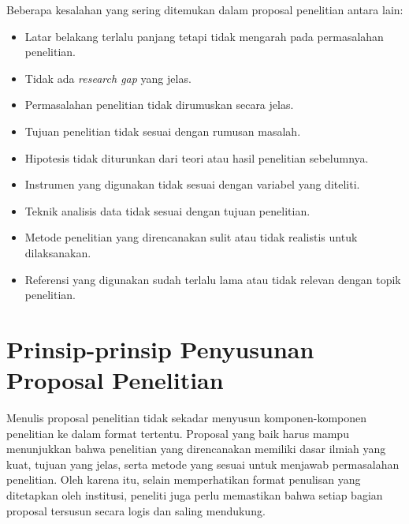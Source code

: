 \documentclass[
  indonesian,
  letterpaper,
  DIV=11,
  numbers=noendperiod]{scrreprt}
\providecommand{\tightlist}{%
  \setlength{\itemsep}{0pt}\setlength{\parskip}{0pt}}
\begin{document}
\begin{tcolorbox}[enhanced jigsaw, colframe=quarto-callout-caution-color-frame, toptitle=1mm, breakable, leftrule=.75mm, arc=.35mm, toprule=.15mm, colback=white, colbacktitle=quarto-callout-caution-color!10!white, bottomtitle=1mm, bottomrule=.15mm, titlerule=0mm, title=\textcolor{quarto-callout-caution-color}{\faFire}\hspace{0.5em}{Kesalahan yang Sering Ditemukan dalam Proposal Penelitian}, coltitle=black, left=2mm, opacitybacktitle=0.6, opacityback=0, rightrule=.15mm]

Beberapa kesalahan yang sering ditemukan dalam proposal penelitian
antara lain:

\begin{itemize}
\tightlist
\item
  Latar belakang terlalu panjang tetapi tidak mengarah pada permasalahan
  penelitian.
\item
  Tidak ada \emph{research gap} yang jelas.
\item
  Permasalahan penelitian tidak dirumuskan secara jelas.
\item
  Tujuan penelitian tidak sesuai dengan rumusan masalah.
\item
  Hipotesis tidak diturunkan dari teori atau hasil penelitian
  sebelumnya.
\item
  Instrumen yang digunakan tidak sesuai dengan variabel yang diteliti.
\item
  Teknik analisis data tidak sesuai dengan tujuan penelitian.
\item
  Metode penelitian yang direncanakan sulit atau tidak realistis untuk
  dilaksanakan.
\item
  Referensi yang digunakan sudah terlalu lama atau tidak relevan dengan
  topik penelitian.
\end{itemize}

\end{tcolorbox}

\section{Prinsip-prinsip Penyusunan Proposal
Penelitian}\label{prinsip-prinsip-penyusunan-proposal-penelitian}

Menulis proposal penelitian tidak sekadar menyusun komponen-komponen
penelitian ke dalam format tertentu. Proposal yang baik harus mampu
menunjukkan bahwa penelitian yang direncanakan memiliki dasar ilmiah
yang kuat, tujuan yang jelas, serta metode yang sesuai untuk menjawab
permasalahan penelitian. Oleh karena itu, selain memperhatikan format
penulisan yang ditetapkan oleh institusi, peneliti juga perlu memastikan
bahwa setiap bagian proposal tersusun secara logis dan saling mendukung.
\end{document}
